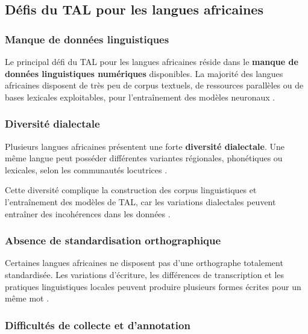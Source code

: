 \subsection{Défis du TAL pour les langues africaines}

\subsubsection{Manque de données linguistiques}

Le principal défi du \ac{TAL} pour les langues africaines réside dans le \textbf{manque de données linguistiques numériques} disponibles. La majorité des langues africaines disposent de très peu de corpus textuels, de ressources parallèles ou de bases lexicales exploitables, pour l'entraînement des modèles neuronaux \cite{ranathunga2023neural, agyei2024low}.

\subsubsection{Diversité dialectale}

Plusieurs langues africaines présentent une forte \textbf{diversité dialectale}. Une même langue peut posséder différentes variantes régionales, phonétiques ou lexicales, selon les communautés locutrices \cite{agyei2024low, mandiya2026lingala}.

Cette diversité complique la construction des corpus linguistiques et l'entraînement des modèles de \ac{TAL}, car les variations dialectales peuvent entraîner des incohérences dans les données \cite{haulai2023construction}.

\subsubsection{Absence de standardisation orthographique}

Certaines langues africaines ne disposent pas d'une orthographe totalement standardisée. Les variations d'écriture, les différences de transcription et les pratiques linguistiques locales peuvent produire plusieurs formes écrites pour un même mot \cite{haulai2023construction, jindal2017building}.

\subsubsection{Difficultés de collecte et d'annotation}

